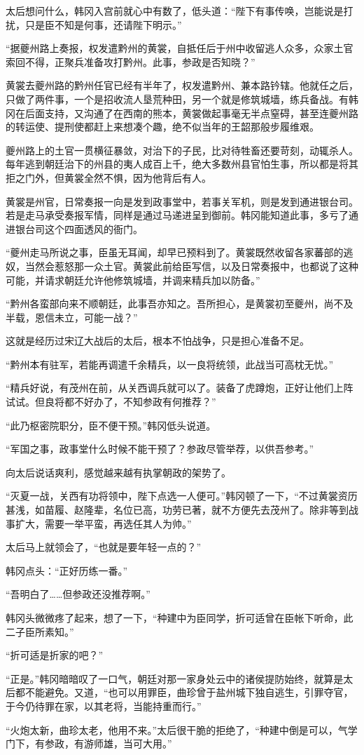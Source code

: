 太后想问什么，韩冈入宫前就心中有数了，低头道：“陛下有事传唤，岂能说是打扰，只是臣不知是何事，还请陛下明示。”

“据夔州路上奏报，权发遣黔州的黄裳，自抵任后于州中收留逃人众多，众家土官索回不得，正聚兵准备攻打黔州。此事，参政是否知晓？”

黄裳去夔州路的黔州任官已经有半年了，权发遣黔州、兼本路钤辖。他就任之后，只做了两件事，一个是招收流人垦荒种田，另一个就是修筑城墙，练兵备战。有韩冈在后面支持，又沟通了在西南的熊本，黄裳做起事毫无半点窒碍，甚至连夔州路的转运使、提刑使都赶上来想凑个趣，绝不似当年的王韶那般步履维艰。

夔州路上的土官一贯横征暴敛，对治下的子民，比对待牲畜还要苛刻，动辄杀人。每年逃到朝廷治下的州县的夷人成百上千，绝大多数州县官怕生事，所以都是将其拒之门外，但黄裳全然不惧，因为他背后有人。

黄裳是州官，日常奏报一向是发到政事堂中，若事关军机，则是发到通进银台司。若是走马承受奏报军情，同样是通过马递进呈到御前。韩冈能知道此事，多亏了通进银台司这个四面透风的衙门。

“夔州走马所说之事，臣虽无耳闻，却早已预料到了。黄裳既然收留各家蕃部的逃奴，当然会惹怒那一众土官。黄裳此前给臣写信，以及日常奏报中，也都说了这种可能，并请求朝廷允许他修筑城墙，并调来精兵加以防备。”

“黔州各蛮部向来不顺朝廷，此事吾亦知之。吾所担心，是黄裳初至夔州，尚不及半载，恩信未立，可能一战？”

这就是经历过宋辽大战后的太后，根本不怕战争，只是担心准备不足。

“黔州本有驻军，若能再调遣千余精兵，以一良将统领，此战当可高枕无忧。”

“精兵好说，有茂州在前，从关西调兵就可以了。装备了虎蹲炮，正好让他们上阵试试。但良将都不好办了，不知参政有何推荐？”

“此乃枢密院职分，臣不便干预。”韩冈低头说道。

“军国之事，政事堂什么时候不能干预了？参政尽管举荐，以供吾参考。”

向太后说话爽利，感觉越来越有执掌朝政的架势了。

“灭夏一战，关西有功将领中，陛下点选一人便可。”韩冈顿了一下，“不过黄裳资历甚浅，如苗履、赵隆辈，名位已高，功劳已著，就不方便先去茂州了。除非等到战事扩大，需要一举平蛮，再选任其人为帅。”

太后马上就领会了，“也就是要年轻一点的？”

韩冈点头：“正好历练一番。”

“吾明白了……但参政还没推荐啊。”

韩冈头微微疼了起来，想了一下，“种建中为臣同学，折可适曾在臣帐下听命，此二子臣所素知。”

“折可适是折家的吧？”

“正是。”韩冈暗暗叹了一口气，朝廷对那一家身处云中的诸侯提防始终，就算是太后都不能避免。又道，“也可以用罪臣，曲珍曾于盐州城下独自逃生，引罪夺官，于今仍待罪在家，以其老将，当能持重而行。”

“火炮太新，曲珍太老，他用不来。”太后很干脆的拒绝了，“种建中倒是可以，气学门下，有参政，有游师雄，当可大用。”
